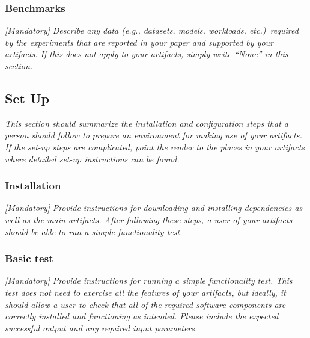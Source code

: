 \documentclass[sigconf]{acmart}
\begin{document}

\subsubsection{Benchmarks}

\emph{[Mandatory]}
%
\emph{Describe any data (e.g., datasets, models, workloads,
etc.)\ required by the experiments that are reported in your paper and
supported by your artifacts.  If this does not apply to your
artifacts, simply write ``None'' in this section.}


\subsection{Set Up}

\emph{This section should summarize the installation and configuration
steps that a person should follow to prepare an environment for making
use of your artifacts.  If the set-up steps are complicated, point the
reader to the places in your artifacts where detailed set-up
instructions can be found.}


\subsubsection{Installation}

\emph{[Mandatory]}
%
\emph{Provide instructions for downloading and installing dependencies
as well as the main artifacts.  After following these steps, a user of
your artifacts should be able to run a simple functionality test.}


\subsubsection{Basic test}

\emph{[Mandatory]}
%
\emph{Provide instructions for running a simple functionality test.
This test does not need to exercise all the features of your
artifacts, but ideally, it should allow a user to check that all of
the required software components are correctly installed and
functioning as intended.  Please include the expected successful
output and any required input parameters.}

\end{document}
